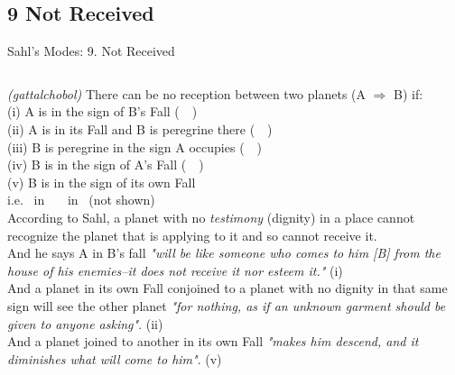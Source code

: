 \subsection{9 Not Received}
\begin{frame}[t]{Sahl's Modes: 9. Not Received}
\footnotesize
\begin{columns}[T, onlytextwidth]
\textsl{(gattalchobol)} There can be no reception between two planets (A $\Rightarrow$ B) if: \\
\vspace{0.25cm}
(i) A is in the sign of B's Fall (\Moon\ \Square\ \Saturn) \\
(ii) A is in its Fall and B is peregrine there (\Venus\ \Sextile\ \Jupiter) \\
(iii) B is peregrine in the sign A occupies (\Jupiter\ \Trine\ \Saturn)\\
(iv) B is in the sign of A's Fall (\Mercury\ \Square\ \Mars) \\
(v) B is in the sign of its own Fall \\
\hspace{1em}i.e. \Moon\ in \Gemini\ \Trine\ \Sun\ in \Libra\ (not shown) \\
\vspace{0.25cm}
According to Sahl, a planet with no \textsl{testimony} (dignity) in a place cannot recognize the planet that is applying to it and so cannot receive it. \\

And he says A in B's fall \textsl{"will be like someone who comes to him [B] from the house of his enemies--it does not receive it nor esteem it."} (i) \\

And a planet in its own Fall conjoined to a planet with no dignity in that same sign will see the other planet \textsl{"for nothing, as if an unknown garment should be given to anyone asking"}. (ii)\\

And a planet joined to another in its own Fall \textsl{"makes him descend, and it diminishes what will come to him"}. (v)


\end{columns}
\end{frame}
